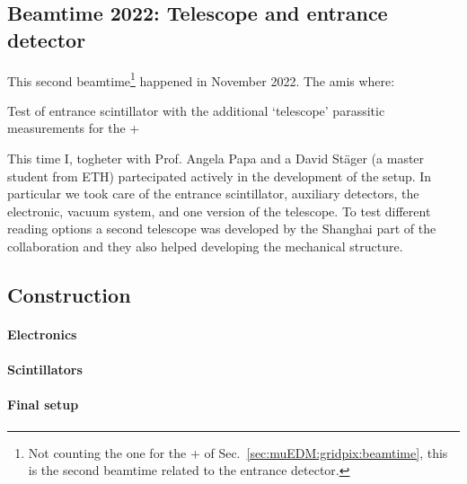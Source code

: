 \begin{refsection}
\section{Beamtime 2022: Telescope and entrance detector}
    This second beamtime\footnote{Not counting the one for the \tpc + \grid of Sec.~\ref{sec:muEDM:gridpix:beamtime}, this is the second beamtime related to the entrance detector.} happened in November 2022.
    The amis where:
    \begin{outline}
        \1 Test of entrance scintillator with the additional `telescope'
        \1 parassitic measurements for the \tpc+ \grid
    \end{outline}
    This time I, togheter with Prof. Angela Papa and a David St\"{a}ger (a master student from ETH) partecipated actively in the development of the setup. 
    In particular we took care of the entrance scintillator, auxiliary detectors, the electronic, vacuum system, and one version of the telescope. 
    To test different reading options a second  telescope was developed by the Shanghai part of the collaboration and they also helped developing the mechanical structure.
    
    \subsection{Construction}
        \paragraph{Electronics}
        \paragraph{Scintillators}
        \paragraph{Final setup}

\end{refsection}
